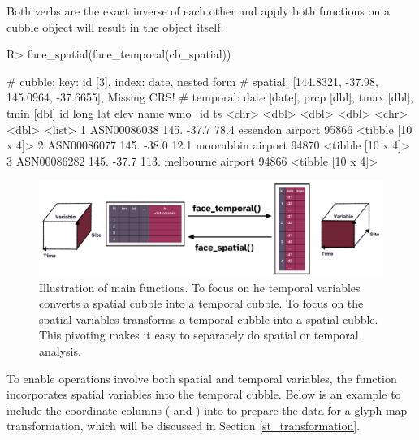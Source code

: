 \documentclass[
  shortnames]{jss}
\begin{document}
Both verbs are the exact inverse of each other and apply both functions on a cubble object will result in the object itself:

\begin{CodeChunk}
\begin{CodeInput}
R> face_spatial(face_temporal(cb_spatial))
\end{CodeInput}
\begin{CodeOutput}
# cubble:   key: id [3], index: date, nested form
# spatial:  [144.8321, -37.98, 145.0964, -37.6655], Missing CRS!
# temporal: date [date], prcp [dbl], tmax [dbl], tmin [dbl]
  id           long   lat  elev name              wmo_id ts               
  <chr>       <dbl> <dbl> <dbl> <chr>              <dbl> <list>           
1 ASN00086038  145. -37.7  78.4 essendon airport   95866 <tibble [10 x 4]>
2 ASN00086077  145. -38.0  12.1 moorabbin airport  94870 <tibble [10 x 4]>
3 ASN00086282  145. -37.7 113.  melbourne airport  94866 <tibble [10 x 4]>
\end{CodeOutput}
\end{CodeChunk}

\begin{CodeChunk}
\begin{figure}

{\centering \includegraphics[width=1\linewidth]{figures/diagram-keynotes/diagram-keynotes.001} 

}

\caption{Illustration of main functions. To focus on he temporal variables  converts a spatial cubble into a temporal cubble. To focus on the spatial variables  transforms a temporal cubble into a spatial cubble. This pivoting makes it easy to separately do spatial or temporal analysis.}\label{fig:face}
\end{figure}
\end{CodeChunk}

To enable operations involve both spatial and temporal variables, the function  incorporates spatial variables into the temporal cubble. Below is an example to include the coordinate columns ( and ) into  to prepare the data for a glyph map transformation, which will be discussed in Section \ref{st_transformation}.
\end{document}

